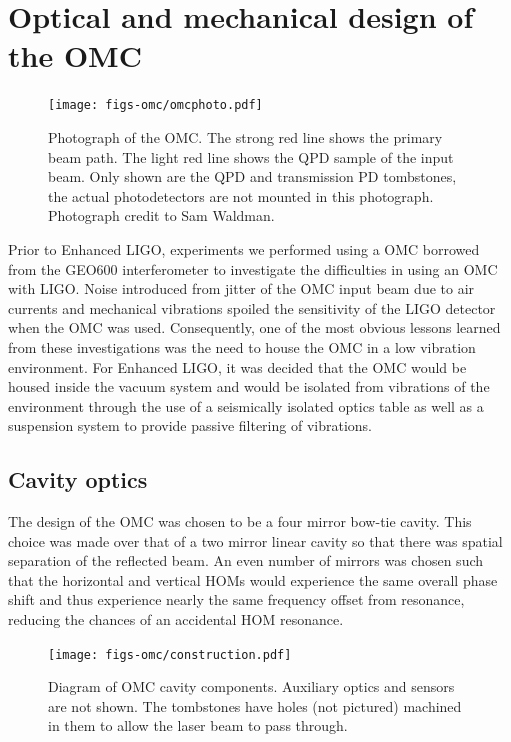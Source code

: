 \section{Optical and mechanical design of the OMC}
\begin{figure}
  \begin{center}
  \leavevmode
  \texttt{[image: figs-omc/omcphoto.pdf]}
  \end{center}
  \caption[Photograph of the OMC.]{Photograph of the OMC. The strong red line shows the primary beam path. The light red line shows the QPD sample of the input beam. Only shown are the QPD and transmission PD tombstones, the actual photodetectors are not mounted in this photograph. Photograph credit to Sam Waldman.}
  \label{fig:omcphoto}
\end{figure}
Prior to Enhanced LIGO, experiments we performed using a OMC borrowed from the GEO600 interferometer to investigate the difficulties in using an OMC with LIGO. %
Noise introduced from jitter of the OMC input beam due to air currents and mechanical vibrations spoiled the sensitivity of the LIGO detector when the OMC was used. %
Consequently, one of the most obvious lessons learned from these investigations was the need to house the OMC in a low vibration environment. %
For Enhanced LIGO, it was decided that the OMC would be housed inside the vacuum system and would be isolated from vibrations of the environment through the use of a seismically isolated optics table as well as a suspension system to provide passive filtering of vibrations.

\subsection{Cavity optics}
The design of the OMC was chosen to be a four mirror bow-tie cavity. %
This choice was made over that of a two mirror linear cavity so that there was spatial separation of the reflected beam. %
An even number of mirrors was chosen such that the horizontal and vertical HOMs would experience the same overall phase shift and thus experience nearly the same frequency offset from resonance, reducing the chances of an accidental HOM resonance.

\begin{figure}
  \begin{center}
  \leavevmode
  \texttt{[image: figs-omc/construction.pdf]}
  \end{center}
  \caption[Diagram of OMC cavity components]{Diagram of OMC cavity components. Auxiliary optics and sensors are not shown. The tombstones have holes (not pictured) machined in them to allow the laser beam to pass through.}
  \label{fig:omcconstruction}
\end{figure}


